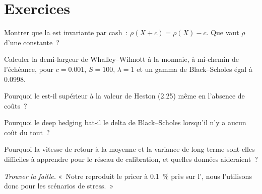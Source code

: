 \section{Exercices}

\begin{exercise}[$\star$]\label{exo:ml:deep-hedging-and-machine-learning-in-pricing:1}
Montrer que la  est invariante par cash~: $\rho(X + c) = \rho(X) - c$. Que vaut $\rho$ d'une constante~?
\end{exercise}

\begin{exercise}[$\star$]\label{exo:ml:deep-hedging-and-machine-learning-in-pricing:2}
Calculer la demi-largeur de Whalley--Wilmott à la monnaie, à mi-chemin de l'échéance, pour $c = 0.001$, $S = 100$, $\lambda = 1$ et un
gamma de Black--Scholes égal à 0.0998.
\end{exercise}

\begin{exercise}[$\star$]\label{exo:ml:deep-hedging-and-machine-learning-in-pricing:3}
Pourquoi le  est-il supérieur à la valeur de Heston (2.25) même en l'absence de coûts~?
\end{exercise}

\begin{exercise}[$\star\star$]\label{exo:ml:deep-hedging-and-machine-learning-in-pricing:4}
Pourquoi le deep hedging bat-il le delta de Black--Scholes lorsqu'il n'y a aucun coût du tout~?
\end{exercise}

\begin{exercise}[$\star\star$]\label{exo:ml:deep-hedging-and-machine-learning-in-pricing:5}
Pourquoi la vitesse de retour à la moyenne et la variance de long terme sont-elles difficiles à apprendre pour le réseau de calibration, et quelles données aideraient~?
\end{exercise}

\begin{exercise}[$\star\star$]\label{exo:ml:deep-hedging-and-machine-learning-in-pricing:6}
\emph{Trouver la faille.} «~Notre  reproduit le pricer à 0.1~\% près sur l', nous l'utilisons donc pour les scénarios de stress.~»
\end{exercise}

